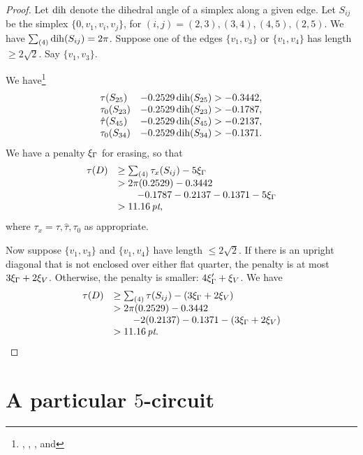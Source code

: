 \begin{proof}
Let $\operatorname{dih}$ denote the dihedral angle of a simplex along a given
edge. Let $S_{ij}$ be the simplex $\{0,v_1,v_i,v_j\}$, for
$(i,j)=(2,3),(3,4), (4,5),(2,5)$. We have $\sum_{(4)}\operatorname{dih}(S_{ij})
= 2\pi$. Suppose one of the edges $\{v_1,v_3\}$ or $\{v_1,v_4\}$ has
length $\ge2\sqrt2$. Say $\{v_1,v_3\}$.

We have\footnote{, ,
, and }
    $$
    \begin{array}{lll}
    \tau(S_{25}) &- 0.2529\operatorname{dih}(S_{25}) > -0.3442,\\
    \tau_0(S_{23}) &- 0.2529\operatorname{dih}(S_{23}) > -0.1787,\\
    \hat\tau(S_{45}) &- 0.2529\operatorname{dih}(S_{45}) > -0.2137,\\
    \tau_0(S_{34}) &- 0.2529\operatorname{dih}(S_{34}) > -0.1371.\\
    \end{array}
    $$
We have a penalty $\xi_\Gamma$ for erasing, so that
    $$
    \begin{array}{lll}
        \tau(D) &\ge \sum_{(4)}\tau_x(S_{ij}) - 5\xi_\Gamma\\
                &>2\pi(0.2529)-0.3442\\
                &\qquad -0.1787-0.2137-0.1371-5\xi_\Gamma\\
                &>11.16\,\hbox{\it pt},
    \end{array}
    $$
where $\tau_x=\tau,\hat\tau,\tau_0$ as appropriate.

Now suppose $\{v_1,v_3\}$ and $\{v_1,v_4\}$ have length $\le2\sqrt2$.
If there is an upright diagonal that is not enclosed over either
flat quarter, the penalty is at most $3\xi_\Gamma+2\xi_V$. Otherwise, the
penalty is smaller: $4\xi_\Gamma'+\xi_V$. We have
    $$
    \begin{array}{lll}
    \tau(D)
    &\ge \sum_{(4)}\tau(S_{ij})-(3\xi_\Gamma+2\xi_V)\\
    &>2\pi(0.2529)-0.3442\\
    &\qquad -2(0.2137)-0.1371 -(3\xi_\Gamma+2\xi_V)\\
    &>11.16\,\hbox{\it pt}.\\
    \end{array}
    $$
\end{proof}

\section{A particular $5$-circuit}

